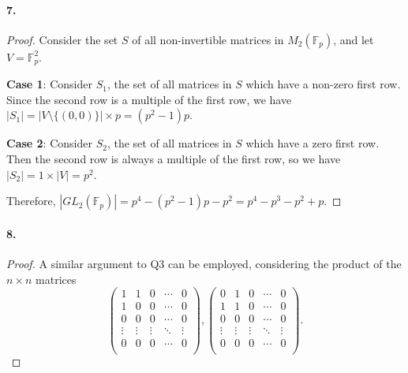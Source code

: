 \documentclass{article}
\begin{document}
\paragraph{7.}
\begin{proof}
  Consider the set $S$ of all non-invertible matrices in $M_2(\mathbb{F}_p)$,
  and let $V = \mathbb{F}_p^2$.

  \textbf{Case 1}: Consider $S_1$, the set of all matrices in $S$ which have a
  non-zero first row. Since the second row is a multiple of the first row, we
  have $|S_1| = |V \setminus\{(0, 0)\}| \times p = (p^2 - 1)p$.

  \textbf{Case 2}: Consider $S_2$, the set of all matrices in $S$ which have a
  zero first row. Then the second row is always a multiple of the first row, so
  we have $|S_2| = 1 \times |V| = p^2$.

  Therefore, $|GL_2(\mathbb{F}_p)| = p^4 - (p^2 - 1)p - p^2 = p^4 - p^3 - p^2 +
  p$.
\end{proof}

\paragraph{8.}
\begin{proof}
  A similar argument to Q3 can be employed, considering the product of the
  $n \times n$ matrices \[
    \begin{pmatrix}
      1 & 1 & 0 & \cdots & 0 \\
      1 & 0 & 0 & \cdots & 0 \\
      0 & 0 & 0 & \cdots & 0 \\
      \vdots & \vdots & \vdots & \ddots & \vdots \\
      0 & 0 & 0 & \cdots & 0 \\
    \end{pmatrix},
    \begin{pmatrix}
      0 & 1 & 0 & \cdots & 0 \\
      1 & 1 & 0 & \cdots & 0 \\
      0 & 0 & 0 & \cdots & 0 \\
      \vdots & \vdots & \vdots & \ddots & \vdots \\
      0 & 0 & 0 & \cdots & 0 \\
    \end{pmatrix}.
  \]
\end{proof}
\end{document}
